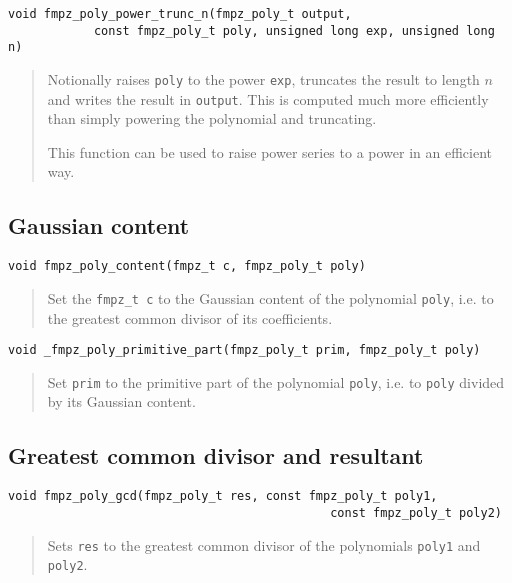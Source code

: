 \documentclass[a4paper,10pt]{article}
\newcommand{\code}{\lstinline}
\begin{document}
\begin{lstlisting}
void fmpz_poly_power_trunc_n(fmpz_poly_t output, 
            const fmpz_poly_t poly, unsigned long exp, unsigned long n) 
\end{lstlisting}
\begin{quote}
Notionally raises \code{poly} to the power \code{exp}, truncates the result to length $n$ and writes the result in \code{output}. This is computed much more efficiently than simply powering the polynomial and truncating.

This function can be used to raise power series to a power in an efficient way.
\end{quote}

\subsection{Gaussian content}

\begin{lstlisting}
void fmpz_poly_content(fmpz_t c, fmpz_poly_t poly)
\end{lstlisting}
\begin{quote}
Set the \code{fmpz_t c} to the Gaussian content of the polynomial \code{poly}, i.e. to the greatest common divisor of its coefficients.
\end{quote}

\begin{lstlisting}
void _fmpz_poly_primitive_part(fmpz_poly_t prim, fmpz_poly_t poly)
\end{lstlisting}
\begin{quote}
Set \code{prim} to the primitive part of the polynomial \code{poly}, i.e. to \code{poly} divided by its Gaussian content.
\end{quote}

\subsection{Greatest common divisor and resultant}
\begin{lstlisting}
void fmpz_poly_gcd(fmpz_poly_t res, const fmpz_poly_t poly1, 
                                             const fmpz_poly_t poly2)
\end{lstlisting}
\begin{quote}
Sets \code{res} to the greatest common divisor of the polynomials \code{poly1} and \code{poly2}.
\end{quote}
\end{document}
